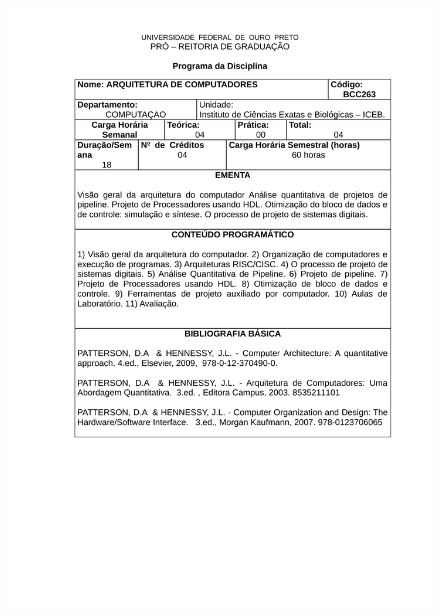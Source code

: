\begin{figure}[p]
	\centering 
	\includegraphics[scale=0.7]{capitulos/anexo1-programas-disciplina/eg12.pdf}
\end{figure}

